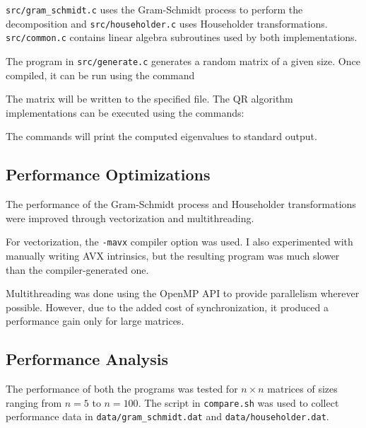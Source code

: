 \documentclass{article}
\begin{document}

\texttt{src/gram\_schmidt.c} uses the Gram-Schmidt process to perform the
decomposition and \texttt{src/householder.c} uses Householder transformations.
\texttt{src/common.c} contains linear algebra subroutines used by both implementations.

The program in \texttt{src/generate.c} generates a random matrix of a given size.
Once compiled, it can be run using the command


The matrix will be written to the specified file. The QR algorithm implementations can be
executed using the commands:


The commands will print the computed eigenvalues to standard output.


\subsection{Performance Optimizations}

The performance of the Gram-Schmidt process and Householder transformations were improved
through vectorization and multithreading.

For vectorization, the \texttt{-mavx} compiler option was used. I also experimented with
manually writing AVX intrinsics, but the resulting program was much slower than the
compiler-generated one.

Multithreading was done using the OpenMP API to provide parallelism
wherever possible. However, due to the added cost of synchronization, it produced a
performance gain only for large matrices.

\subsection{Performance Analysis}

The performance of both the programs was tested for $n \times n$ matrices of sizes
ranging from $n = 5$ to $n = 100$. The script in \texttt{compare.sh} was used to
collect performance data in \texttt{data/gram\_schmidt.dat} and \texttt{data/householder.dat}.
\end{document}
